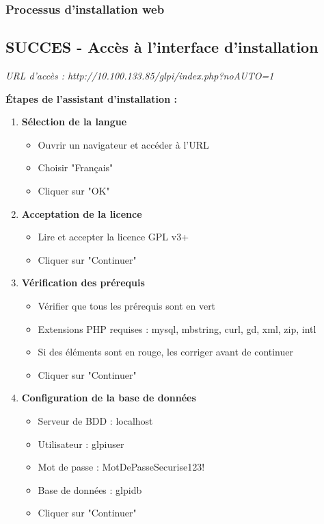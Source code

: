 \documentclass[12pt,a4paper]{article}
\newcommand{\successbox}[2]{\subsection{SUCCES - #1}\textit{#2}}
\begin{document}
\subsubsection{Processus d'installation web}
\successbox{Accès à l'interface d'installation}{
URL d'accès : http://10.100.133.85/glpi/index.php?noAUTO=1
}

\textbf{Étapes de l'assistant d'installation :}
\begin{enumerate}
    \item \textbf{Sélection de la langue}
    \begin{itemize}
        \item Ouvrir un navigateur et accéder à l'URL
        \item Choisir "Français"
        \item Cliquer sur "OK"
    \end{itemize}
    
    \item \textbf{Acceptation de la licence}
    \begin{itemize}
        \item Lire et accepter la licence GPL v3+
        \item Cliquer sur "Continuer"
    \end{itemize}
    
    \item \textbf{Vérification des prérequis}
    \begin{itemize}
        \item Vérifier que tous les prérequis sont en vert
        \item Extensions PHP requises : mysql, mbstring, curl, gd, xml, zip, intl
        \item Si des éléments sont en rouge, les corriger avant de continuer
        \item Cliquer sur "Continuer"
    \end{itemize}
    
    \item \textbf{Configuration de la base de données}
    \begin{itemize}
        \item Serveur de BDD : localhost
        \item Utilisateur : glpiuser
        \item Mot de passe : MotDePasseSecurise123!
        \item Base de données : glpidb
        \item Cliquer sur "Continuer"
    \end{itemize}
    

\end{enumerate}
\end{document}
